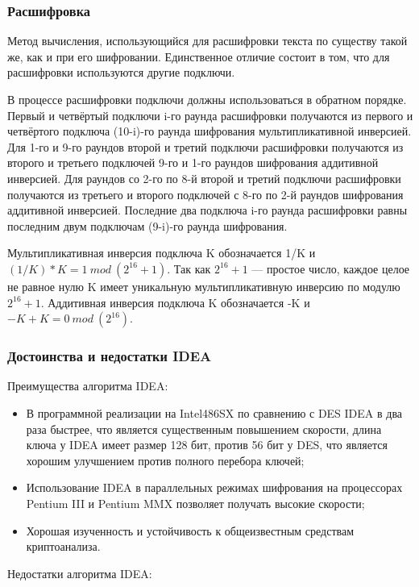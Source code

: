 \documentclass[a4paper]{report}
\begin{document}
\subsubsection{Расшифровка}
Метод вычисления, использующийся для расшифровки текста по существу такой же, как и при его шифровании. Единственное отличие состоит в том, что для расшифровки используются другие подключи.

В процессе расшифровки подключи должны использоваться в обратном порядке. Первый и четвёртый подключи i-го раунда расшифровки получаются из первого и четвёртого подключа (10-i)-го раунда шифрования мультипликативной инверсией. Для 1-го и 9-го раундов второй и третий подключи расшифровки получаются из второго и третьего подключей 9-го и 1-го раундов шифрования аддитивной инверсией. Для раундов со 2-го по 8-й второй и третий подключи расшифровки получаются из третьего и второго подключей с 8-го по 2-й раундов шифрования аддитивной инверсией. Последние два подключа i-го раунда расшифровки равны последним двум подключам (9-i)-го раунда шифрования.

Мультипликативная инверсия подключа K обозначается 1/K и \\ $(1/K)*K=1\ mod\ (2^{16}+1)$. Так как $2^{16}+1$ — простое число, каждое целое не равное нулю K имеет уникальную мультипликативную инверсию по модулю \\ $2^{16}+1$. Аддитивная инверсия подключа K обозначается -K и $-K+K=0\ mod\ (2^{16})$.

\subsubsection{Достоинства и недостатки IDEA}
Преимущества алгоритма IDEA:

\begin{itemize}
\item В программной реализации на Intel486SX по сравнению с DES IDEA в два раза быстрее, что является существенным повышением скорости, длина ключа у IDEA имеет размер 128 бит, против 56 бит у DES, что является хорошим улучшением против полного перебора ключей;
\item Использование IDEA в параллельных режимах шифрования на процессорах Pentium III и Pentium MMX позволяет получать высокие скорости;
\item  Хорошая изученность и устойчивость к общеизвестным средствам криптоанализа.
\end{itemize}

Недостатки алгоритма IDEA:
\end{document}
